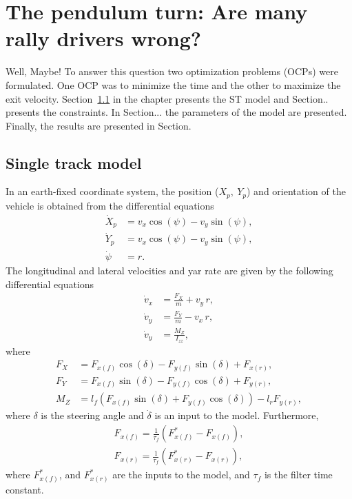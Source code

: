 \chapter[PEP: Pundilum Turn]{The pendulum turn: Are many rally drivers wrong?}

Well, Maybe! To answer this question two optimization problems (OCPs) were formulated. One OCP was to minimize the time and the other to maximize the exit velocity. Section~\ref{sec:STM} in the chapter presents the ST model and Section.. presents the constraints. In Section... the parameters of the model are presented. Finally, the results are presented in Section.

\section[ST model]{Single track model}\label{sec:STM}
In an earth-fixed coordinate system, the position ($X_p,\ Y_p$) and orientation of the vehicle is obtained from the differential equations
\begin{subequations}
    \begin{align}
        \dot X_p &= v_x\cos\left(\psi\right) - v_y\sin\left(\psi\right), \\
        \dot Y_p &= v_x\cos\left(\psi\right) - v_y\sin\left(\psi\right), \\
        \dot \psi &= r.
    \end{align}
\end{subequations}
The longitudinal and lateral velocities and yar rate are given by the following differential equations 
\begin{subequations}
    \begin{align}
        \dot v_x &= \frac{F_X}{m} + v_y\,r,\\
        \dot v_y &= \frac{F_Y}{m} - v_x\,r,\\
        \dot v_y &= \frac{M_Z}{I_{zz}},
    \end{align}
\end{subequations}
where 
\begin{subequations}
    \begin{align}
        F_X &= F_{x(f)}\cos\left(\delta\right) - F_{y(f)}\sin\left(\delta\right) + F_{x(r)},\\
        F_Y &= F_{x(f)}\sin\left(\delta\right) - F_{y(f)}\cos\left(\delta\right) + F_{y(r)},\\
        M_Z &= l_f\left(F_{x(f)}\sin\left(\delta\right) + F_{y(f)}\cos\left(\delta\right)\right) - l_rF_{y(r)},
    \end{align}
\end{subequations}
where $\delta$ is the steering angle and $\dot \delta$ is an input to the model. Furthermore, 
\begin{subequations}
    \begin{align}
        F_{x(f)} = \frac{1}{\tau_f}\left(F_{x(f)}^* - F_{x(f)}\right),\\
        F_{x(r)} = \frac{1}{\tau_f}\left(F_{x(r)}^* - F_{x(r)}\right),
    \end{align}
\end{subequations}
where $F_{x(f)}^*$, and $F_{x(r)}^*$ are the inputs to the model, and $\tau_f$ is the filter time constant. 

